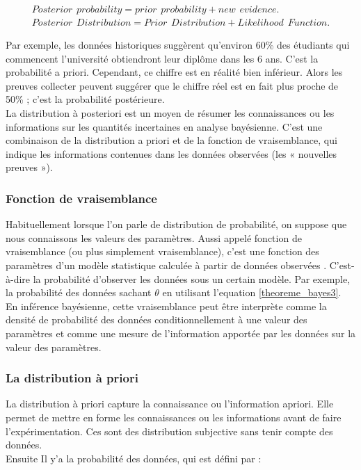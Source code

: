 \begin{equation}
    \begin{split}
		Posterior \hspace{5pt} probability = prior \hspace{5pt} probability + new \hspace{5pt} evidence. \\
        Posterior \hspace{5pt} Distribution = Prior \hspace{5pt} Distribution + Likelihood \hspace{5pt} Function.
	\end{split}
	\label{posterior_probability_distribution}
\end{equation}

Par exemple, les données historiques suggèrent qu'environ 60\% des étudiants qui commencent l'université obtiendront leur diplôme dans les 6 ans. C'est la probabilité a priori. Cependant, ce chiffre est en réalité bien inférieur. Alors les preuves collecter peuvent suggérer que le chiffre réel est en fait plus proche de 50\% ; c'est la probabilité postérieure. \\
La distribution à posteriori est un moyen de résumer les connaissances ou les informations sur les quantités incertaines en analyse bayésienne. C'est une combinaison de la distribution a priori et de la fonction de vraisemblance, qui indique les informations contenues dans les données observées (les « nouvelles preuves »).

\subsubsection{Fonction de vraisemblance}
Habituellement lorsque l’on parle de distribution de probabilité, on suppose que nous connaissons les valeurs des paramètres. Aussi appelé fonction de vraisemblance (ou plus simplement vraisemblance), c’est une fonction des paramètres d'un modèle statistique calculée à partir de données observées \cite{fisher1922mathematical}. C’est-à-dire la probabilité d’observer les données sous un certain modèle. Par exemple, la probabilité des données sachant \(\displaystyle \theta \) en utilisant l'equation \ref{theoreme_bayes3}.
En inférence bayésienne, cette vraisemblance peut être interprète comme la densité de probabilité des données conditionnellement à une valeur des paramètres et comme une mesure de l'information apportée par les données sur la valeur des paramètres.

\subsubsection{La distribution à priori}
La distribution à priori capture la connaissance ou l’information apriori. Elle permet de mettre en forme les connaissances ou les informations avant de faire l’expérimentation. Ces sont des distribution subjective sans tenir compte des données. \\
Ensuite Il y’a la probabilité des données, qui est défini par :


